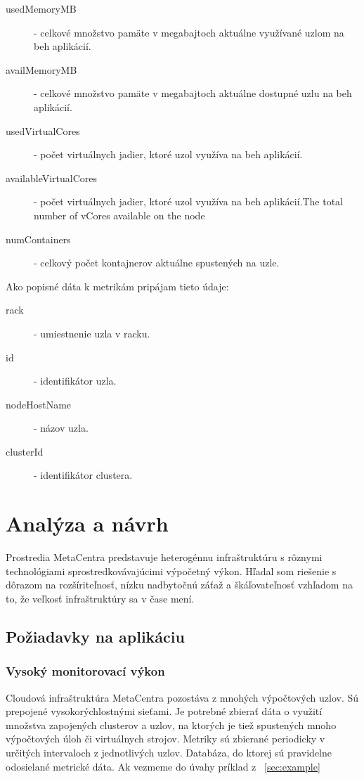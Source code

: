 \documentclass[12pt,twoside,color,cover,table]{fithesis3}
\begin{document}
\begin{description}
\item[usedMemoryMB] - celkové množstvo pamäte v megabajtoch aktuálne využívané uzlom na beh aplikácií.
\item[availMemoryMB] - celkové množstvo pamäte v megabajtoch aktuálne dostupné uzlu na beh aplikácií.
\item[usedVirtualCores] - počet virtuálnych jadier, ktoré uzol využíva na beh aplikácií.
\item[availableVirtualCores] - počet virtuálnych jadier, ktoré uzol využíva na beh aplikácií.The total number of vCores available on the node
\item[numContainers] - celkový počet kontajnerov aktuálne spustených na uzle.
\end{description}

Ako popisné dáta k metrikám pripájam tieto údaje:
\begin{description}
\item[rack] - umiestnenie uzla v racku.
\item[id] - identifikátor uzla.
\item[nodeHostName] - názov uzla.
\item[clusterId] - identifikátor clustera.
\end{description}

\chapter{Analýza a návrh}
Prostredia MetaCentra predstavuje heterogénnu infraštruktúru s rôznymi technológiami sprostredkovávajúcimi výpočetný výkon. Hľadal som riešenie s dôrazom na rozšíriteľnosť, 
nízku nadbytočnú záťaž a škáľovateľnosť vzhľadom na to, že veľkosť infraštruktúry sa v čase mení.

\section{Požiadavky na aplikáciu}
\subsection{Vysoký monitorovací výkon}
Cloudová infraštruktúra MetaCentra pozostáva z mnohých výpočtových uzlov. Sú prepojené vysokorýchlostnými sieťami. Je potrebné zbierať dáta o využití množstva zapojených
clusterov a uzlov, na ktorých je tiež spustených mnoho výpočtových úloh či virtuálnych strojov. Metriky sú zbierané periodicky v určitých intervaloch z jednotlivých uzlov. 
Databáza, do ktorej sú pravidelne odosielané metrické dáta. Ak vezmeme do úvahy príklad z ~\ref{sec:example}
\end{document}
